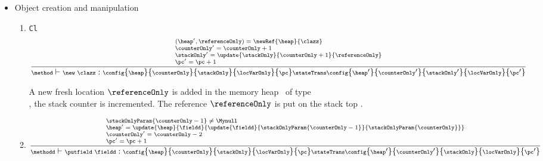 \begin{itemize}
   \item Object creation and manipulation 

     \begin{enumerate}

      \item \new \texttt{Cl}
            $${\scriptsize \frac{\begin{array}{l}
			(\heap',\referenceOnly) = \newRef{\heap}{\clazz} \\ 
			\counterOnly' = \counterOnly + 1\\
			\stackOnly' = \update{\stackOnly}{\counterOnly +  1}{ \referenceOnly  } \\
			\pc' = \pc + 1
	          \end{array}}
              {\method \vdash \new \ \clazz :  \config{\heap}{\counterOnly}{\stackOnly}{\locVarOnly}{\pc} 
		               \stateTrans  
			       \config{\heap'}
			              {\counterOnly'}
				      {\stackOnly' }
				      {\locVarOnly}
				      {\pc'}  } } $$
	      
	      A new fresh location $\referenceOnly$ is added in the memory heap \heap \ of type \\
               \clazz, the  stack counter \counterOnly is incremented.
	      The reference $\referenceOnly$ is put on the stack top . 
	


	\item \putfield  
           
	   $${\scriptsize \frac{ \begin{array}{l}
	               \stackOnlyParam{\counterOnly - 1} \neq \Mynull   \\
		              \heap' = \update{\heap}{\fieldd }{\update{\fieldd}{\stackOnlyParam{\counterOnly - 1}}{\stackOnlyParam{\counterOnly }}} \\
			      \counterOnly' = \counterOnly - 2 \\
			      \pc' = \pc + 1
		      \end{array}   
		   }
                   { \methodd \vdash  \putfield \ \fieldd:  \config{\heap}{\counterOnly}{\stackOnly}{\locVarOnly}{\pc} 
                                               \stateTrans  
					       \config{\heap'}{\counterOnly'}{\stackOnly}{\locVarOnly}{\pc'} } } $$   


\end{enumerate}
\end{itemize}
